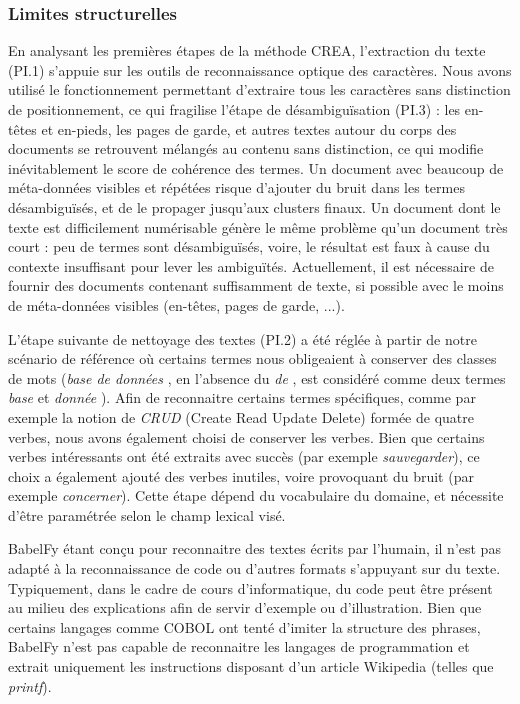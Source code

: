 \subsubsection{Limites structurelles}
\label{subsubsection:Evaluation:Discussions:LimitesMethode:LimitesStructurelles}

En analysant les premières étapes de la méthode CREA, l'extraction du texte (PI.1) s'appuie sur les outils de reconnaissance optique des caractères.
Nous avons utilisé le fonctionnement permettant d'extraire tous les caractères sans distinction de positionnement, ce qui fragilise l'étape de désambiguïsation (PI.3) : les en-têtes et en-pieds, les pages de garde, et autres textes autour du corps des documents se retrouvent mélangés au contenu sans distinction, ce qui modifie inévitablement le score de cohérence des termes.
Un document avec beaucoup de méta-données visibles et répétées risque d'ajouter du bruit dans les termes désambiguïsés, et de le propager jusqu'aux clusters finaux.
Un document dont le texte est difficilement numérisable génère le même problème qu'un document très court : peu de termes sont désambiguïsés, voire, le résultat est faux à cause du contexte insuffisant pour lever les ambiguïtés.
Actuellement, il est nécessaire de fournir des documents contenant suffisamment de texte, si possible avec le moins de méta-données visibles (en-têtes, pages de garde, ...).

\bigskip

L'étape suivante de nettoyage des textes (PI.2) a été réglée à partir de notre scénario de référence où certains termes nous obligeaient à conserver des classes de mots (\og \textit{base de données} \fg, en l'absence du \og \textit{de} \fg , est considéré comme deux termes \og \textit{base}  et \og \textit{donnée} \fg ).
Afin de reconnaitre certains termes spécifiques, comme par exemple la notion de \textit{CRUD} (Create Read Update Delete) formée de quatre verbes, nous avons également choisi de conserver les verbes.
Bien que certains verbes intéressants ont été extraits avec succès (par exemple \textit{sauvegarder}), ce choix a également ajouté des verbes inutiles, voire provoquant du bruit (par exemple \textit{concerner}).
Cette étape dépend du vocabulaire du domaine, et nécessite d'être paramétrée selon le champ lexical visé.

\bigskip

BabelFy étant conçu pour reconnaitre des textes écrits par l'humain, il n'est pas adapté à la reconnaissance de code ou d'autres formats s'appuyant sur du texte.
Typiquement, dans le cadre de cours d'informatique, du code peut être présent au milieu des explications afin de servir d'exemple ou d'illustration.
Bien que certains langages comme COBOL ont tenté d'imiter la structure des phrases, BabelFy n'est pas capable de reconnaitre les langages de programmation et extrait uniquement les instructions disposant d'un article Wikipedia (telles que \textit{printf}).

